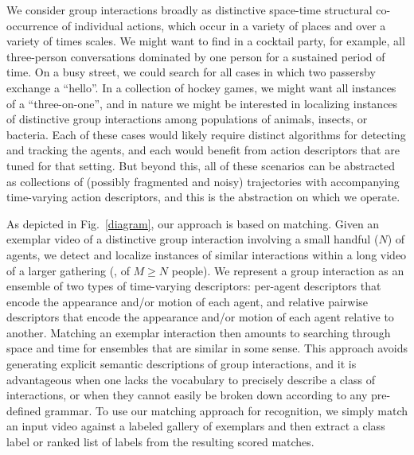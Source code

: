 We consider group interactions broadly as distinctive space-time structural co-occurrence of individual actions, which occur in a variety of places and over a variety of times scales. We might want to find in a cocktail party, for example, all three-person conversations dominated by one person for a sustained period of time. On a busy street, we could search for all cases in which two passersby exchange a ``hello''. In a collection of hockey games, we might want all instances of a ``three-on-one'', and in nature we might be interested in localizing instances of distinctive group interactions among populations of animals, insects, or bacteria. Each of these cases would likely require distinct algorithms for detecting and tracking the agents, and each would benefit from action descriptors that are tuned for that setting. But beyond this, all of these scenarios can be abstracted as collections of (possibly fragmented and noisy) trajectories with accompanying time-varying action descriptors, and this is the abstraction on which we operate.
 
As depicted in Fig.~\ref{diagram}, our approach is based on matching. Given an exemplar video of a distinctive group interaction involving a small handful ($N$) of agents, we detect and localize instances of similar interactions within a long video of a larger gathering (\ie, of $M\ge N$ people). We represent a group interaction as an ensemble of two types of time-varying descriptors: per-agent descriptors that encode the appearance and/or motion of each agent, and relative pairwise descriptors that encode the appearance and/or motion of each agent relative to another. Matching an exemplar interaction then amounts to searching through space and time for ensembles that are similar in some sense. This approach avoids generating explicit semantic descriptions of group interactions, and it is advantageous when one lacks the vocabulary to precisely describe a class of interactions, or when they cannot easily be broken down according to any pre-defined grammar. To use our matching approach for recognition, we simply match an input video against a labeled gallery of exemplars and then extract a class label or ranked list of labels from the resulting scored matches.

